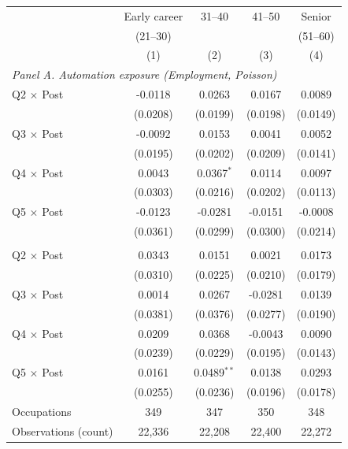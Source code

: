 \begin{tabular}{lcccc}
\toprule
 & Early career & 31--40 & 41--50 & Senior \\
 & (21--30) &  &  & (51--60) \\
 & (1) & (2) & (3) & (4) \\
\midrule
\multicolumn{5}{l}{\textit{Panel A. Automation exposure (Employment, Poisson)}} \\
Q2 $\times$ Post & -0.0118 & 0.0263 & 0.0167 & 0.0089 \\
 & (0.0208) & (0.0199) & (0.0198) & (0.0149) \\
Q3 $\times$ Post & -0.0092 & 0.0153 & 0.0041 & 0.0052 \\
 & (0.0195) & (0.0202) & (0.0209) & (0.0141) \\
Q4 $\times$ Post & 0.0043 & 0.0367$^{*}$ & 0.0114 & 0.0097 \\
 & (0.0303) & (0.0216) & (0.0202) & (0.0113) \\
Q5 $\times$ Post & -0.0123 & -0.0281 & -0.0151 & -0.0008 \\
 & (0.0361) & (0.0299) & (0.0300) & (0.0214) \\
\addlinespace
\multicolumn{5}{l}{\textit{Panel B. Augmentation exposure (Employment, Poisson)}} \\
Q2 $\times$ Post & 0.0343 & 0.0151 & 0.0021 & 0.0173 \\
 & (0.0310) & (0.0225) & (0.0210) & (0.0179) \\
Q3 $\times$ Post & 0.0014 & 0.0267 & -0.0281 & 0.0139 \\
 & (0.0381) & (0.0376) & (0.0277) & (0.0190) \\
Q4 $\times$ Post & 0.0209 & 0.0368 & -0.0043 & 0.0090 \\
 & (0.0239) & (0.0229) & (0.0195) & (0.0143) \\
Q5 $\times$ Post & 0.0161 & 0.0489$^{**}$ & 0.0138 & 0.0293 \\
 & (0.0255) & (0.0236) & (0.0196) & (0.0178) \\
\midrule
Occupations & 349 & 347 & 350 & 348 \\
Observations (count) & 22,336 & 22,208 & 22,400 & 22,272 \\
\bottomrule
\end{tabular}
